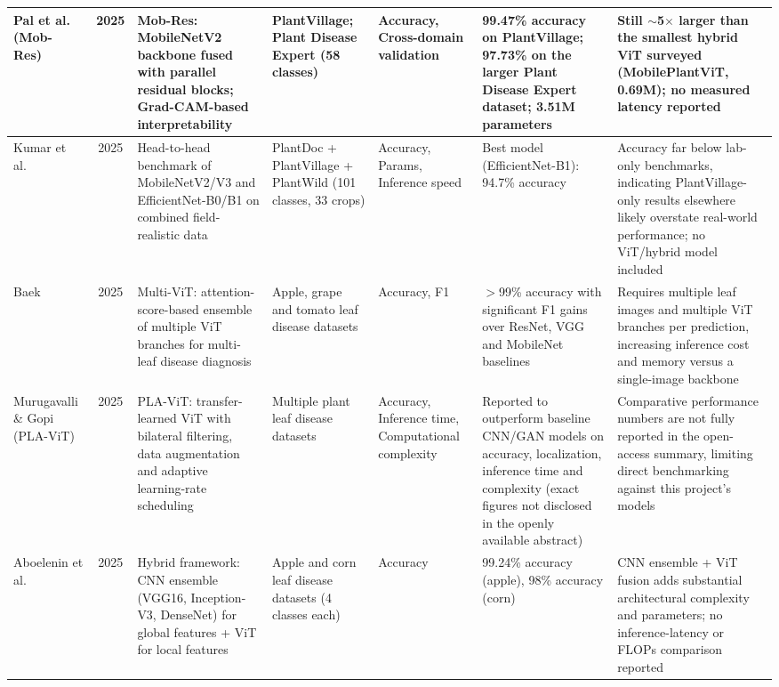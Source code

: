 \documentclass[conference]{IEEEtran}
\begin{document}
\begin{table}[!p]
\begin{tabular}{|P{0.087\textwidth}|c|P{0.189\textwidth}|P{0.133\textwidth}|P{0.097\textwidth}|P{0.174\textwidth}|P{0.199\textwidth}|}
\hline
Pal et al. (Mob-Res)~\cite{pal2025mobres} & 2025 & Mob-Res: MobileNetV2 backbone fused with parallel residual blocks; Grad-CAM-based interpretability & PlantVillage; Plant Disease Expert (58 classes) & Accuracy, Cross-domain validation & 99.47\% accuracy on PlantVillage; 97.73\% on the larger Plant Disease Expert dataset; 3.51M parameters & Still $\sim$5$\times$ larger than the smallest hybrid ViT surveyed (MobilePlantViT, 0.69M); no measured latency reported \\
\hline
Kumar et al.~\cite{kumar2025mobilefriendly} & 2025 & Head-to-head benchmark of MobileNetV2/V3 and EfficientNet-B0/B1 on combined field-realistic data & PlantDoc + PlantVillage + PlantWild (101 classes, 33 crops) & Accuracy, Params, Inference speed & Best model (EfficientNet-B1): 94.7\% accuracy & Accuracy far below lab-only benchmarks, indicating PlantVillage-only results elsewhere likely overstate real-world performance; no ViT/hybrid model included \\
\hline
Baek~\cite{baek2025multivit} & 2025 & Multi-ViT: attention-score-based ensemble of multiple ViT branches for multi-leaf disease diagnosis & Apple, grape and tomato leaf disease datasets & Accuracy, F1 & $>$99\% accuracy with significant F1 gains over ResNet, VGG and MobileNet baselines & Requires multiple leaf images and multiple ViT branches per prediction, increasing inference cost and memory versus a single-image backbone \\
\hline
Murugavalli \& Gopi (PLA-ViT)~\cite{murugavalli2025plavit} & 2025 & PLA-ViT: transfer-learned ViT with bilateral filtering, data augmentation and adaptive learning-rate scheduling & Multiple plant leaf disease datasets & Accuracy, Inference time, Computational complexity & Reported to outperform baseline CNN/GAN models on accuracy, localization, inference time and complexity (exact figures not disclosed in the openly available abstract) & Comparative performance numbers are not fully reported in the open-access summary, limiting direct benchmarking against this project's models \\
\hline
Aboelenin et al.~\cite{aboelenin2025hybrid} & 2025 & Hybrid framework: CNN ensemble (VGG16, Inception-V3, DenseNet) for global features + ViT for local features & Apple and corn leaf disease datasets (4 classes each) & Accuracy & 99.24\% accuracy (apple), 98\% accuracy (corn) & CNN ensemble + ViT fusion adds substantial architectural complexity and parameters; no inference-latency or FLOPs comparison reported \\
\hline
\end{tabular}
\end{table}
\end{document}
